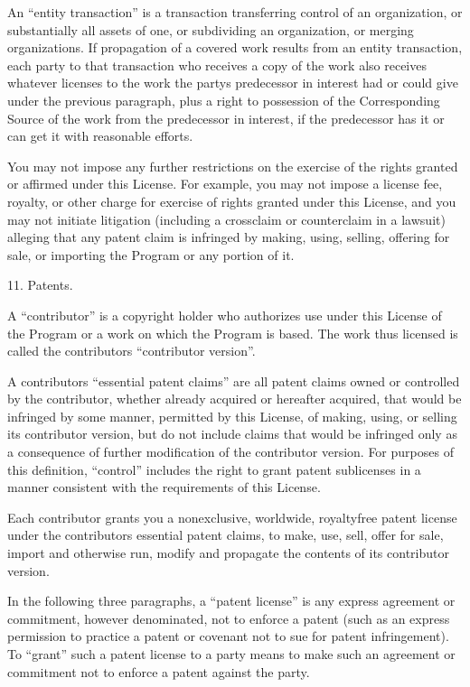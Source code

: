 \documentclass[letterpaper,10pt,english]{sphinxmanual}
\begin{document}
\begin{sphinxVerbatim}[commandchars=\\\{\}]
    An “entity transaction” is a transaction transferring control of an
    organization, or substantially all assets of one, or subdividing an
    organization, or merging organizations. If propagation of a covered work
    results from an entity transaction, each party to that transaction who
    receives a copy of the work also receives whatever licenses to the work the
    party\PYGZsq{}s predecessor in interest had or could give under the previous
    paragraph, plus a right to possession of the Corresponding Source of the
    work from the predecessor in interest, if the predecessor has it or can get
    it with reasonable efforts.

    You may not impose any further restrictions on the exercise of the rights
    granted or affirmed under this License. For example, you may not impose a
    license fee, royalty, or other charge for exercise of rights granted under
    this License, and you may not initiate litigation (including a cross\PYGZhy{}claim
    or counterclaim in a lawsuit) alleging that any patent claim is infringed
    by making, using, selling, offering for sale, or importing the Program or
    any portion of it.

 11. Patents.

    A “contributor” is a copyright holder who authorizes use under this License
    of the Program or a work on which the Program is based. The work thus
    licensed is called the contributor\PYGZsq{}s “contributor version”.

    A contributor\PYGZsq{}s “essential patent claims” are all patent claims owned or
    controlled by the contributor, whether already acquired or hereafter
    acquired, that would be infringed by some manner, permitted by this
    License, of making, using, or selling its contributor version, but do not
    include claims that would be infringed only as a consequence of further
    modification of the contributor version. For purposes of this definition,
    “control” includes the right to grant patent sublicenses in a manner
    consistent with the requirements of this License.

    Each contributor grants you a non\PYGZhy{}exclusive, worldwide, royalty\PYGZhy{}free patent
    license under the contributor\PYGZsq{}s essential patent claims, to make, use,
    sell, offer for sale, import and otherwise run, modify and propagate the
    contents of its contributor version.

    In the following three paragraphs, a “patent license” is any express
    agreement or commitment, however denominated, not to enforce a patent (such
    as an express permission to practice a patent or covenant not to sue for
    patent infringement). To “grant” such a patent license to a party means to
    make such an agreement or commitment not to enforce a patent against the
    party.


\end{sphinxVerbatim}
\end{document}
